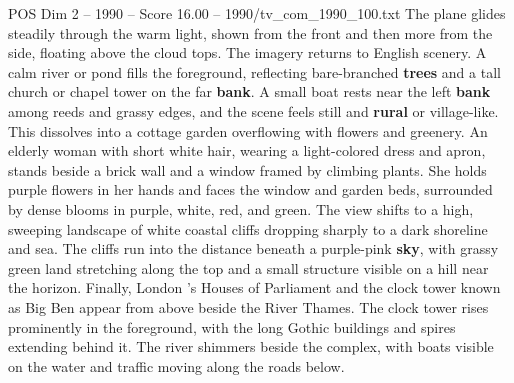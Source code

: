 \begin{textsample}{POS Dim 2 – 1990 – Score 16.00 – 1990/tv\_com\_1990\_100.txt}
The plane glides steadily through the warm light, shown from the front and then more from the side, floating above the cloud tops.
The imagery returns to English scenery.
A calm river or pond fills the foreground, reflecting bare-branched \textbf{trees} and a tall church or chapel tower on the far \textbf{bank}.
A small boat rests near the left \textbf{bank} among reeds and grassy edges, and the scene feels still and \textbf{rural} or village-like.
This dissolves into a cottage garden overflowing with flowers and greenery.
An elderly woman with short white hair, wearing a light-colored dress and apron, stands beside a brick wall and a window framed by climbing plants.
She holds purple flowers in her hands and faces the window and garden beds, surrounded by dense blooms in purple, white, red, and green.
The view shifts to a high, sweeping landscape of white coastal cliffs dropping sharply to a dark shoreline and sea.
The cliffs run into the distance beneath a purple-pink \textbf{sky}, with grassy green land stretching along the top and a small structure visible on a hill near the horizon.
Finally, London ’s Houses of Parliament and the clock tower known as Big Ben appear from above beside the River Thames.
The clock tower rises prominently in the foreground, with the long Gothic buildings and spires extending behind it.
The river shimmers beside the complex, with boats visible on the water and traffic moving along the roads below.

\end{textsample}
